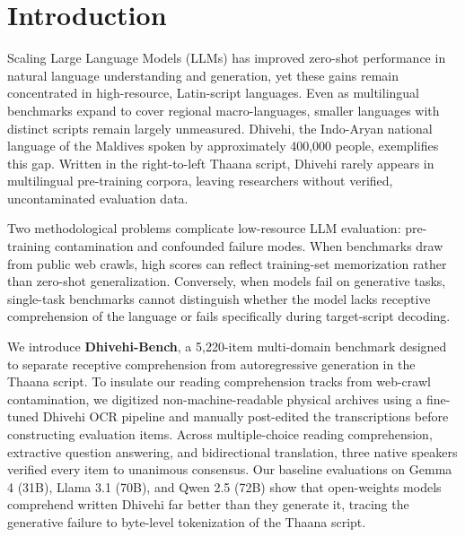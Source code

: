 \documentclass[acmsmall,review,anonymous]{acmart}
\begin{document}


\maketitle

\section{Introduction}

Scaling Large Language Models (LLMs) has improved zero-shot performance in natural language understanding and generation, yet these gains remain concentrated in high-resource, Latin-script languages. Even as multilingual benchmarks expand to cover regional macro-languages, smaller languages with distinct scripts remain largely unmeasured. Dhivehi, the Indo-Aryan national language of the Maldives spoken by approximately 400,000 people, exemplifies this gap. Written in the right-to-left Thaana script, Dhivehi rarely appears in multilingual pre-training corpora, leaving researchers without verified, uncontaminated evaluation data.

Two methodological problems complicate low-resource LLM evaluation: pre-training contamination and confounded failure modes. When benchmarks draw from public web crawls, high scores can reflect training-set memorization rather than zero-shot generalization. Conversely, when models fail on generative tasks, single-task benchmarks cannot distinguish whether the model lacks receptive comprehension of the language or fails specifically during target-script decoding.

We introduce \textbf{Dhivehi-Bench}, a 5,220-item multi-domain benchmark designed to separate receptive comprehension from autoregressive generation in the Thaana script. To insulate our reading comprehension tracks from web-crawl contamination, we digitized non-machine-readable physical archives using a fine-tuned Dhivehi OCR pipeline and manually post-edited the transcriptions before constructing evaluation items. Across multiple-choice reading comprehension, extractive question answering, and bidirectional translation, three native speakers verified every item to unanimous consensus. Our baseline evaluations on Gemma 4 (31B), Llama 3.1 (70B), and Qwen 2.5 (72B) show that open-weights models comprehend written Dhivehi far better than they generate it, tracing the generative failure to byte-level tokenization of the Thaana script.
\end{document}
